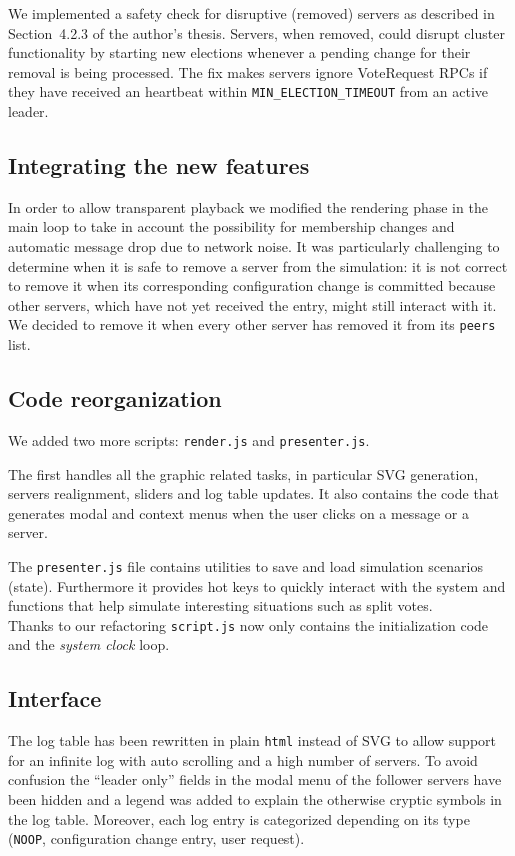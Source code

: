 We implemented a safety check for disruptive (removed) servers as described
in Section~4.2.3 of the author's thesis.
Servers, when removed, could disrupt cluster functionality by starting new
elections whenever a pending change for their removal
is being processed. The fix makes servers ignore VoteRequest RPCs if they have received an heartbeat within
\texttt{MIN\_ELECTION\_TIMEOUT} from an active leader.

\subsection{Integrating the new features}
In order to allow transparent playback we modified the rendering phase in the main loop to take in account the possibility for
membership changes and automatic message drop due to network noise.
It was particularly challenging to determine when it is safe to remove a server
from the simulation: it is not correct to remove it when its corresponding configuration change is committed because
other servers, which have not yet received the entry, might still interact with it.
We decided to remove it when every other server has removed it from its \texttt{peers} list.

\subsection{Code reorganization}
We added two more scripts: \texttt{render.js} and \texttt{presenter.js}.

The first handles all the graphic related tasks, in particular SVG generation,
servers realignment, sliders and log table updates.
It also contains the code that generates modal and context menus when
the user clicks on a message or a server.

The \texttt{presenter.js} file contains utilities to save and load simulation scenarios (state).
Furthermore it provides hot keys to quickly interact with the system and
functions that help simulate interesting situations such as split votes.\\

Thanks to our refactoring \texttt{script.js} now only contains the
initialization code and the \emph{system clock} loop.


\subsection{Interface}
The log table has been rewritten in plain \texttt{html} instead of SVG
to allow support for an infinite log with auto scrolling and a high number of servers.
To avoid confusion the ``leader only'' fields in the modal menu of the
follower servers have been hidden and a legend was added to explain the
otherwise cryptic symbols in the log table. Moreover, each log entry
is categorized depending on its type (\texttt{NOOP}, configuration change entry, user request).

